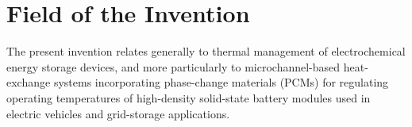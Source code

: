 \section{Field of the Invention}

The present invention relates generally to thermal management of electrochemical energy
storage devices, and more particularly to microchannel-based heat-exchange systems
incorporating phase-change materials (PCMs) for regulating operating temperatures of
high-density solid-state battery modules used in electric vehicles and grid-storage
applications.

